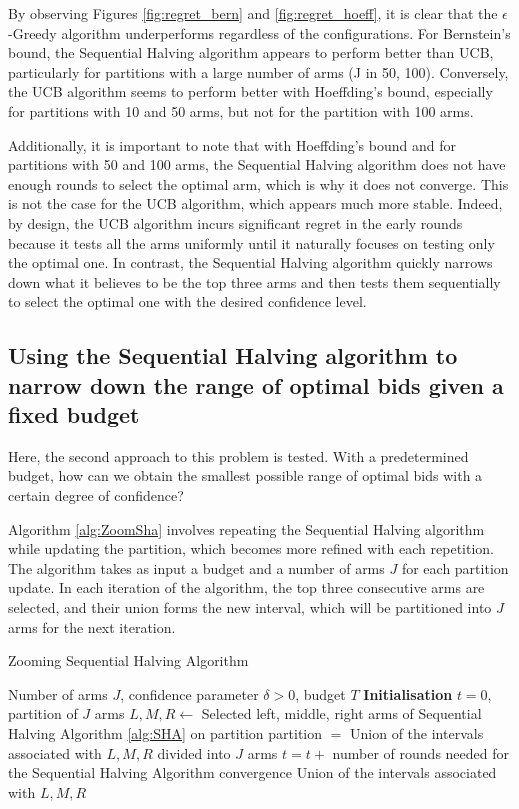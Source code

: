 \documentclass{statsmsc}
\begin{document}
By observing Figures \ref{fig:regret_bern} and \ref{fig:regret_hoeff}, it is clear that the $\epsilon$-Greedy algorithm underperforms regardless of the configurations. For Bernstein's bound, the Sequential Halving algorithm appears to perform better than UCB, particularly for partitions with a large number of arms (J in 50, 100). Conversely, the UCB algorithm seems to perform better with Hoeffding's bound, especially for partitions with 10 and 50 arms, but not for the partition with 100 arms.

Additionally, it is important to note that with Hoeffding's bound and for partitions with 50 and 100 arms, the Sequential Halving algorithm does not have enough rounds to select the optimal arm, which is why it does not converge. This is not the case for the UCB algorithm, which appears much more stable. Indeed, by design, the UCB algorithm incurs significant regret in the early rounds because it tests all the arms uniformly until it naturally focuses on testing only the optimal one. In contrast, the Sequential Halving algorithm quickly narrows down what it believes to be the top three arms and then tests them sequentially to select the optimal one with the desired confidence level.

\subsection{Using the Sequential Halving algorithm to narrow down the range of optimal bids given a fixed budget}

Here, the second approach to this problem is tested. With a predetermined budget, how can we obtain the smallest possible range of optimal bids with a certain degree of confidence?

Algorithm \ref{alg:ZoomSha} involves repeating the Sequential Halving algorithm while updating the partition, which becomes more refined with each repetition. The algorithm takes as input a budget and a number of arms
$J$ for each partition update. In each iteration of the algorithm, the top three consecutive arms are selected, and their union forms the new interval, which will be partitioned into
$J$ arms for the next iteration.

\begin{algorithm}[H]
  \caption{Zooming Sequential Halving Algorithm}
  \label{alg:ZoomSha}
    \begin{algorithmic}
      \Require Number of arms $J$, confidence parameter $\delta>0$, budget $T$
      \State \textbf{Initialisation} $t = 0$, partition of $J$ arms
      \State $L, M, R \gets$ Selected left, middle, right arms of Sequential Halving Algorithm \ref{alg:SHA} on partition 
      \State partition $ = $ Union of the intervals associated with $L, M, R$ divided into $J$ arms
      \State $t = t + $ number of rounds needed for the Sequential Halving Algorithm convergence
      \EndWhile
      \Return Union of the intervals associated with $L, M, R$
     \end{algorithmic}
  \end{algorithm}
\end{document}
